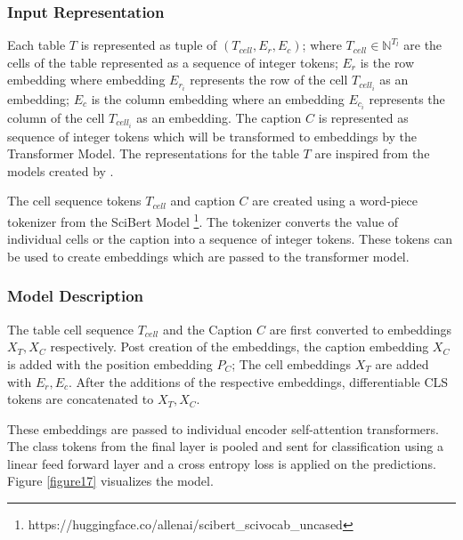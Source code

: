 \subsubsection{Input Representation}
\label{table_classification:models:encoder-model:input-rep}
Each table $T$ is represented as tuple of $(T_{cell},E_r,E_c)$; where $T_{cell} \in \mathbb{N}^{T_l}$ are the cells of the table represented as a sequence of integer tokens; $E_r$ is the row embedding where embedding $E_{r_{i}}$ represents the row of the cell $T_{cell_{i}}$ as an embedding;  $E_c$ is the column embedding where an embedding $E_{c_{i}}$ represents the column of the cell $T_{cell_{i}}$ as an embedding. The caption $C$ is represented as sequence of integer tokens which will be transformed to embeddings by the Transformer Model. The representations for the table $T$ are inspired from the models created by \cite{deng2020turl}. 

The cell sequence tokens $T_{cell}$ and caption $C$ are created using a word-piece tokenizer from the SciBert Model \footnote{https://huggingface.co/allenai/scibert\_scivocab\_uncased}. The tokenizer converts the value of individual cells or the caption into a sequence of integer tokens. These tokens can be used to create embeddings which are passed to the transformer model. 

\subsubsection{Model Description}
The table cell sequence $T_{cell}$ and the Caption $C$ are first converted to embeddings $X_T, X_C$ respectively. Post creation of the embeddings, the caption embedding  $X_C$ is added with the position embedding $P_C$; The cell embeddings $X_T$ are added with $E_r,E_c$. After the additions of the respective embeddings, differentiable CLS tokens are concatenated to $X_T,X_C$.

These embeddings are passed to individual encoder self-attention transformers. The class tokens from the final layer is pooled and sent for classification using a linear feed forward layer and a cross entropy loss is applied on the predictions. Figure \ref{figure17} visualizes the model. 


